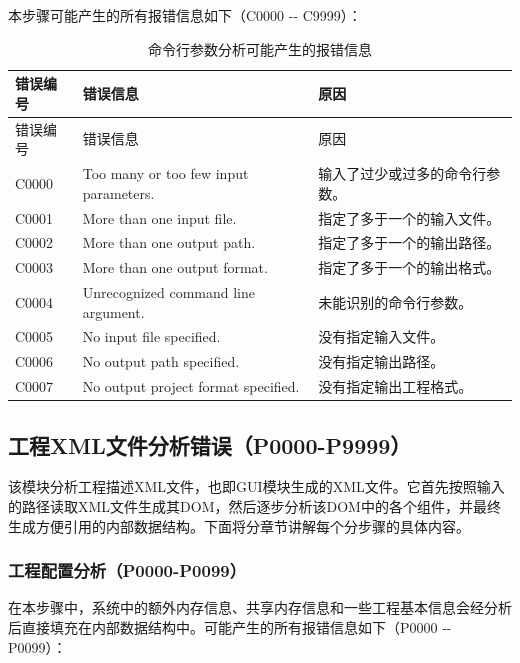 本步骤可能产生的所有报错信息如下（C0000 -\/- C9999）：

\begin{xltabular}{\textwidth}{@{}>{\hsize\raggedright\arraybackslash}X>{\hsize\raggedright\arraybackslash}X>{\hsize\raggedright\arraybackslash}X@{}}
\caption{命令行参数分析可能产生的报错信息}\label{tab:5-2}\\
\toprule
错误编号 & 错误信息 & 原因\tabularnewline
\endfirsthead
\toprule
错误编号 & 错误信息 & 原因\tabularnewline
\midrule
\endhead
\bottomrule
\endlastfoot
C0000 & Too many or too few input parameters. &
输入了过少或过多的命令行参数。\tabularnewline
C0001 & More than one input file. &
指定了多于一个的输入文件。\tabularnewline
C0002 & More than one output path. &
指定了多于一个的输出路径。\tabularnewline
C0003 & More than one output format. &
指定了多于一个的输出格式。\tabularnewline
C0004 & Unrecognized command line argument. &
未能识别的命令行参数。\tabularnewline
C0005 & No input file specified. & 没有指定输入文件。\tabularnewline
C0006 & No output path specified. & 没有指定输出路径。\tabularnewline
C0007 & No output project format specified. &
没有指定输出工程格式。\tabularnewline
\end{xltabular}

\newpage
\subsection{工程XML文件分析错误（P0000-P9999）}\label{subsec:5-6-2}

该模块分析工程描述XML文件，也即GUI模块生成的XML文件。它首先按照输入的路径读取XML文件生成其DOM，然后逐步分析该DOM中的各个组件，并最终生成方便引用的内部数据结构。下面将分章节讲解每个分步骤的具体内容。

\subsubsection{工程配置分析（P0000-P0099）}\label{subsubsec:5-6-2-1}

在本步骤中，系统中的额外内存信息、共享内存信息和一些工程基本信息会经分析后直接填充在内部数据结构中。可能产生的所有报错信息如下（P0000
-\/- P0099）：

